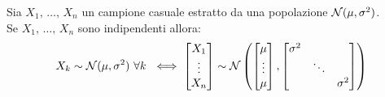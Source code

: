 \begin{prop}
  Sia $X_1, \, \dots, \,  X_n$ un campione casuale estratto da una popolazione $\mathcal N( \mu, \sigma^2)$. \\
  Se $X_1, \, \dots, \,  X_n$ sono indipendenti allora:
  $$X_k \sim \mathcal N(\mu, \sigma^2) \ \forall k \ \iff \begin{bmatrix} X_1 \\ \vdots \\ X_n \end{bmatrix} \sim \mathcal N \left(\begin{bmatrix} \mu \\ \vdots \\ \mu \end{bmatrix}, \begin{bmatrix}\sigma^2 & & \\ & \ddots & \\ & & \sigma^2 \end{bmatrix} \right)$$
\end{prop}

